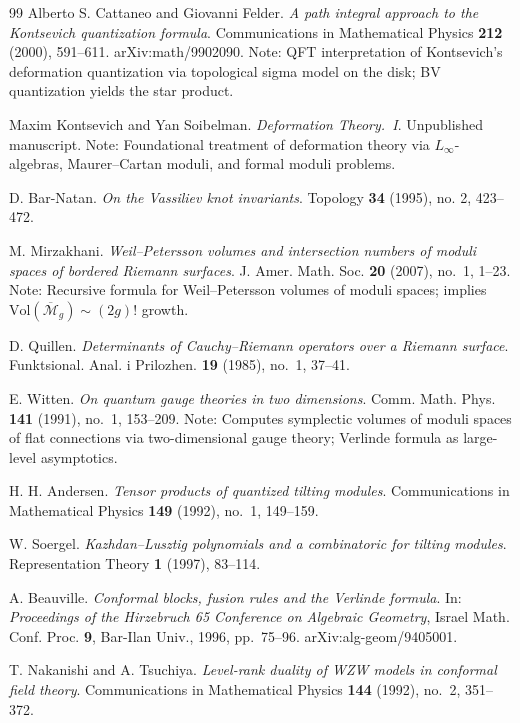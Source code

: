 \begin{thebibliography}{99}
Alberto S. Cattaneo and Giovanni Felder.
\textit{A path integral approach to the Kontsevich quantization formula}.
Communications in Mathematical Physics \textbf{212} (2000), 591--611.
arXiv:math/9902090.
Note: QFT interpretation of Kontsevich's deformation quantization
via topological sigma model on the disk; BV quantization yields
the star product.

Maxim Kontsevich and Yan Soibelman.
\textit{Deformation Theory.\ I}.
Unpublished manuscript.
Note: Foundational treatment of deformation theory via $L_\infty$-algebras,
Maurer--Cartan moduli, and formal moduli problems.

D. Bar-Natan.
\textit{On the Vassiliev knot invariants}.
Topology \textbf{34} (1995), no. 2, 423--472.

M. Mirzakhani.
\textit{Weil--Petersson volumes and intersection numbers of moduli spaces of bordered Riemann surfaces}.
J. Amer. Math. Soc. \textbf{20} (2007), no.~1, 1--23.
Note: Recursive formula for Weil--Petersson volumes of moduli spaces;
implies $\mathrm{Vol}(\overline{\mathcal{M}}_g) \sim (2g)!$ growth.

D. Quillen.
\textit{Determinants of Cauchy--Riemann operators over a Riemann surface}.
Funktsional. Anal. i Prilozhen. \textbf{19} (1985), no.~1, 37--41.

E. Witten.
\textit{On quantum gauge theories in two dimensions}.
Comm. Math. Phys. \textbf{141} (1991), no.~1, 153--209.
Note: Computes symplectic volumes of moduli spaces of flat connections
via two-dimensional gauge theory; Verlinde formula as large-level
asymptotics.

H. H. Andersen.
\textit{Tensor products of quantized tilting modules}.
Communications in Mathematical Physics \textbf{149} (1992), no.~1, 149--159.

W. Soergel.
\textit{Kazhdan--Lusztig polynomials and a combinatoric for tilting modules}.
Representation Theory \textbf{1} (1997), 83--114.

A. Beauville.
\textit{Conformal blocks, fusion rules and the Verlinde formula}.
In: \textit{Proceedings of the Hirzebruch 65 Conference on Algebraic Geometry},
Israel Math. Conf. Proc. \textbf{9}, Bar-Ilan Univ., 1996, pp.~75--96.
arXiv:alg-geom/9405001.

T. Nakanishi and A. Tsuchiya.
\textit{Level-rank duality of WZW models in conformal field theory}.
Communications in Mathematical Physics \textbf{144} (1992), no.~2, 351--372.


\end{thebibliography}

